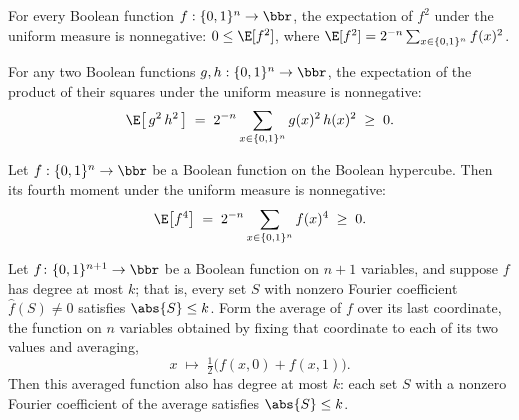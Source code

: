\begin{lemma}
\leanok
{}
\label{BooleanAnalysis.Hypercontractivity.expect_sq_nonneg}
For every Boolean function $f : \{0,1\}^n \to \bbr$, the expectation of $f^2$ under the
uniform measure is nonnegative: $0 \le \E[f^2]$, where $\E[f^2] =
2^{-n}\sum_{x\in\{0,1\}^n} f(x)^2$.
\end{lemma}

\begin{lemma}
\leanok
{}
\label{BooleanAnalysis.Hypercontractivity.expect_sq_nonneg_prod}
For any two Boolean functions $g, h : \{0,1\}^n \to \bbr$, the expectation of the
product of their squares under the uniform measure is nonnegative:
\[
\E\!\left[\,g^2\, h^2\,\right] \;=\; 2^{-n} \sum_{x \in \{0,1\}^n} g(x)^2\, h(x)^2
\;\ge\; 0.
\]
\end{lemma}

\begin{lemma}
\leanok
{}
\label{BooleanAnalysis.Hypercontractivity.expect_fourth_nonneg}
Let $f : \{0,1\}^n \to \bbr$ be a Boolean function on the Boolean hypercube. Then its
fourth moment under the uniform measure is nonnegative:
\[
  \E\!\left[f^4\right] \;=\; 2^{-n}\sum_{x\in\{0,1\}^n} f(x)^4 \;\ge\; 0.
\]
\end{lemma}

\begin{lemma}
\leanok
{}
\label{BooleanAnalysis.Hypercontractivity.degree_avgLast}
Let $f\colon\{0,1\}^{n+1}\to\bbr$ be a Boolean function on $n+1$ variables, and suppose
$f$ has degree at most $k$; that is, every set $S$ with nonzero Fourier coefficient
$\hat f(S)\ne 0$ satisfies $\abs{S}\le k$. Form the average of $f$ over its last
coordinate, the function on $n$ variables obtained by fixing that coordinate to each of
its two values and averaging,
\[
  x \;\longmapsto\; \tfrac12\bigl(f(x,0) + f(x,1)\bigr).
\]
Then this averaged function also has degree at most $k$: each set $S$ with a nonzero
Fourier coefficient of the average satisfies $\abs{S}\le k$.
\end{lemma}

